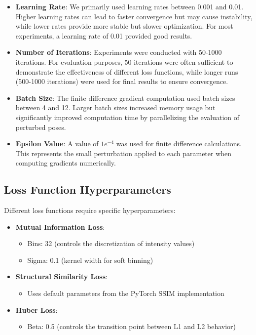 \begin{itemize}
    \item \textbf{Learning Rate}: We primarily used learning rates between 0.001 and 0.01. Higher learning rates can lead to faster convergence but may cause instability, while lower rates provide more stable but slower optimization. For most experiments, a learning rate of 0.01 provided good results.
    
    \item \textbf{Number of Iterations}: Experiments were conducted with 50-1000 iterations. For evaluation purposes, 50 iterations were often sufficient to demonstrate the effectiveness of different loss functions, while longer runs (500-1000 iterations) were used for final results to ensure convergence.
    
    \item \textbf{Batch Size}: The finite difference gradient computation used batch sizes between 4 and 12. Larger batch sizes increased memory usage but significantly improved computation time by parallelizing the evaluation of perturbed poses.
    
    \item \textbf{Epsilon Value}: A value of $1e^{-4}$ was used for finite difference calculations. This represents the small perturbation applied to each parameter when computing gradients numerically.
\end{itemize}

\subsection{Loss Function Hyperparameters}

Different loss functions require specific hyperparameters:

\begin{itemize}
    \item \textbf{Mutual Information Loss}:
    \begin{itemize}
        \item Bins: 32 (controls the discretization of intensity values)
        \item Sigma: 0.1 (kernel width for soft binning)
    \end{itemize}
    
    \item \textbf{Structural Similarity Loss}:
    \begin{itemize}
        \item Uses default parameters from the PyTorch SSIM implementation
    \end{itemize}
    
    \item \textbf{Huber Loss}:
    \begin{itemize}
        \item Beta: 0.5 (controls the transition point between L1 and L2 behavior)
    \end{itemize}
\end{itemize}

